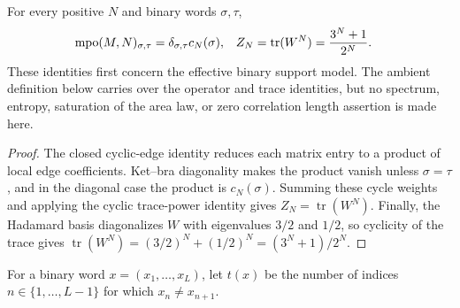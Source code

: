 \begin{lemma}
    \label{thm:cpsv_example411_binary_support_normalization}
    \leanok
    For every positive $N$ and binary words $\sigma,\tau$,
    \begin{align}
        \operatorname{mpo}(M,N)_{\sigma,\tau}
         & =\delta_{\sigma,\tau}c_N(\sigma),
         & Z_N                               & =\operatorname{tr}(W^N)=\frac{3^N+1}{2^N}.
        \notag
    \end{align}
    These identities first concern the effective binary support model.  The
    ambient definition below carries over the operator and trace identities, but
    no spectrum, entropy, saturation of the area law, or zero correlation
    length assertion is made here.
\end{lemma}

\begin{proof}
    \leanok
    The closed cyclic-edge identity reduces each matrix entry to a product of
    local edge coefficients.  Ket--bra diagonality makes the product vanish
    unless $\sigma=\tau$, and in the diagonal case the product is
    $c_N(\sigma)$.  Summing these cycle weights and applying the cyclic
    trace-power identity gives $Z_N=\operatorname{tr}(W^N)$.  Finally, the
    Hadamard basis diagonalizes $W$ with eigenvalues $3/2$ and $1/2$, so
    cyclicity of the trace gives
    $\operatorname{tr}(W^N)=(3/2)^N+(1/2)^N=(3^N+1)/2^N$.
\end{proof}

\begin{definition}
    \label{def:cpsv_example411_binary_internal_transition_count}
    \leanok
    For a binary word $x=(x_1,\ldots,x_L)$, let $t(x)$ be the number of
    indices $n\in\{1,\ldots,L-1\}$ for which $x_n\ne x_{n+1}$.
\end{definition}

